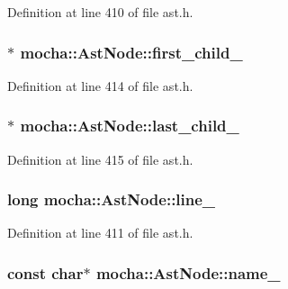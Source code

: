 Definition at line 410 of file ast.h.

\hypertarget{classmocha_1_1_ast_node_a68b1845416afaf64d92dca6f7e3bc8b3}{
\subsubsection[{first\_\-child\_\-}]{$\ast$ {\bf mocha::AstNode::first\_\-child\_\-}}}
\label{classmocha_1_1_ast_node_a68b1845416afaf64d92dca6f7e3bc8b3}


Definition at line 414 of file ast.h.

\hypertarget{classmocha_1_1_ast_node_ab86de84c3ad18dac8f5dcf773baba73b}{
\subsubsection[{last\_\-child\_\-}]{$\ast$ {\bf mocha::AstNode::last\_\-child\_\-}}}
\label{classmocha_1_1_ast_node_ab86de84c3ad18dac8f5dcf773baba73b}


Definition at line 415 of file ast.h.

\hypertarget{classmocha_1_1_ast_node_a3ab61c0ef95a24a3577d0b35222cd100}{
\subsubsection[{line\_\-}]{\setlength{\rightskip}{0pt plus 5cm}long {\bf mocha::AstNode::line\_\-}}}
\label{classmocha_1_1_ast_node_a3ab61c0ef95a24a3577d0b35222cd100}


Definition at line 411 of file ast.h.

\hypertarget{classmocha_1_1_ast_node_a876b49852a3151d977c842a90ee02771}{
\subsubsection[{name\_\-}]{\setlength{\rightskip}{0pt plus 5cm}const char$\ast$ {\bf mocha::AstNode::name\_\-}}}
\label{classmocha_1_1_ast_node_a876b49852a3151d977c842a90ee02771}


